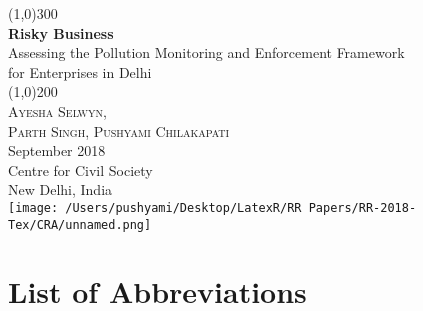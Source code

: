 \documentclass[a4paper, 12pt]{article}
\begin{document}
                    
                    \begin{titlepage}
                    	\begin{center}
                    	\line(1,0){300}\\
                    	[0.25in]
                    	\huge{\bfseries \textcolor{CCSbrown} {Risky Business}} \\
    	[0.5cm]
    	\large  {Assessing the Pollution Monitoring and Enforcement Framework\\  for Enterprises in Delhi} \\
    	
                    	\line(1,0){200}\\
                    	[1in]
                    	\textsc{\huge Ayesha Selwyn, \\ Parth Singh, Pushyami Chilakapati} \\
                    	[1.5cm]
                    	{\Large September 2018} \\
                    	[2.0cm]
                    	{\LARGE Centre for Civil Society} \\
                    	[0.1mm]
                    	{\Large New Delhi, India} \\
    	[2.0cm]
    	\texttt{[image: /Users/pushyami/Desktop/LatexR/RR Papers/RR-2018-Tex/CRA/unnamed.png]}
      
                    	\end{center}
                    \end{titlepage}
                    \tableofcontents
                    
                   \newpage
         
        \section*{List of Abbreviations}
       
\end{document}
